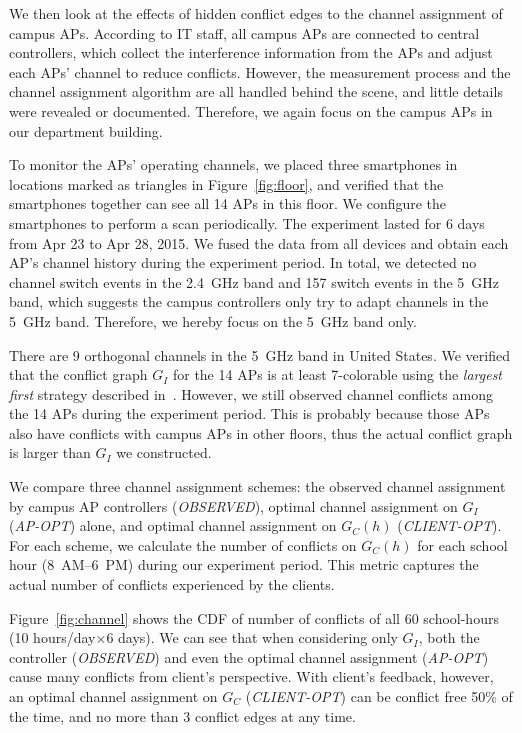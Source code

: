 We then look at the effects of hidden conflict edges to the channel assignment
of campus APs. According to \ub{} IT staff, all campus APs are connected to
central controllers, which collect the interference information from the APs and
adjust each APs' channel to reduce conflicts. However, the measurement process
and the channel assignment algorithm are all handled behind the scene, and
little details were revealed or documented. Therefore, we again focus on
the campus APs in our department building.

To monitor the APs' operating channels, we placed three smartphones in locations
marked as triangles in Figure~\ref{fig:floor}, and verified that the smartphones
together can see all 14 APs in this floor. We configure the smartphones to
perform a \wifi{} scan periodically. The experiment lasted for 6 days from Apr
23 to Apr 28, 2015. We fused the data from all devices and obtain each AP's
channel history during the experiment period. In total, we detected no channel
switch events in the 2.4~GHz band and 157 switch events in the 5~GHz band, which
suggests the campus controllers only try to adapt channels in the 5~GHz band.
Therefore, we hereby focus on the 5~GHz band only.

There are 9 orthogonal channels in the 5~GHz band in United States. We
verified that the conflict graph $G_I$ for the 14 APs is at least 7-colorable
using the \textit{largest first} strategy described
in~\cite{kosowski2004classical}.  However, we still observed channel conflicts
among the 14 APs during the experiment period. This is probably because those APs
also have conflicts with campus APs in other floors, thus the actual conflict
graph is larger than $G_I$ we constructed.

We compare three channel assignment schemes: the observed channel assignment by
campus AP controllers (\textit{OBSERVED}), optimal channel assignment on $G_I$
(\textit{AP-OPT}) alone, and optimal channel assignment on $G_C(h)$
(\textit{CLIENT-OPT}). For each scheme, we calculate the number of conflicts on
$G_C(h)$ for each school hour (8~AM--6~PM) during our experiment period. This
metric captures the actual number of conflicts experienced by the clients.

Figure~\ref{fig:channel} shows the CDF of number of conflicts of all 60 school-hours
(10 hours/day$\times$6 days). We can see that when considering only $G_I$, both the
controller (\textit{OBSERVED}) and even the optimal channel assignment
(\textit{AP-OPT}) cause many conflicts from client's perspective. With client's
feedback, however, an optimal channel assignment on $G_C$ (\textit{CLIENT-OPT})
can be conflict free 50\% of the time, and no more than 3 conflict edges
at any time.


